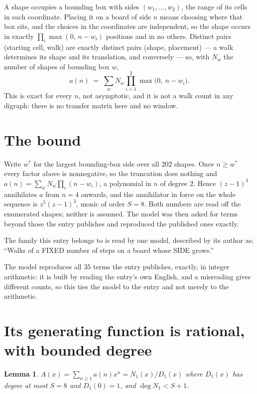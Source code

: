 \documentclass[11pt,a4paper]{article}
\theoremstyle{plain}
\newtheorem{lemma}[theorem]{Lemma}
\theoremstyle{definition}
\begin{document}
A shape occupies a bounding box with sides $(w_1,\dots,w_{2})$, the range of its cells in each
coordinate. Placing it on a board of side $n$ means choosing where that box sits, and the
choices in the coordinates are independent, so the shape occurs in exactly
$\prod_{i}\max(0,\,n-w_i)$ positions and in no others. Distinct pairs (starting cell,
walk) are exactly distinct pairs (shape, placement) --- a walk determines its shape and its
translation, and conversely --- so, with $N_w$ the number of shapes of bounding box $w$,
\[
a(n)\;=\;\sum_{w} N_w \prod_{i=1}^{2}\max\bigl(0,\ n-w_i\bigr).
\]
This is exact for every $n$, not asymptotic, and it is not a walk count in any digraph: there is
no transfer matrix here and no window.

\section{The bound}

Write $w^\ast$ for the largest bounding-box side over all $202$ shapes. Once $n\ge w^\ast$
every factor above is nonnegative, so the truncation does nothing and
$a(n)=\sum_w N_w\prod_i(n-w_i)$, a polynomial in $n$ of degree $2$. Hence $(z-1)^{3}$
annihilates $a$ from $n=4$ onwards, and the annihilator in force on the whole sequence is
$z^{5}(z-1)^{3}$, monic of order $S=8$. Both numbers are read off the enumerated
shapes; neither is assumed. The model was then asked for terms beyond those the entry publishes
and reproduced the published ones exactly.

The family this entry belongs to is read by one model, described by its author as: ``Walks of a FIXED number of steps on a board whose SIDE grows.''


The model reproduces all $35$ terms the entry publishes, exactly, in integer arithmetic:
it is built by reading the entry's own English, and a misreading gives different counts, so
this ties the model to the entry and not merely to the arithmetic.

\section{Its generating function is rational, with bounded degree}

\begin{lemma}\label{lem:rat}
$A(x)=\sum_{n\ge1}a(n)x^n=N_1(x)/D_1(x)$ where $D_1(x)$ has degree at most $S=8$ and
$D_1(0)=1$, and $\deg N_1<S+1$.
\end{lemma}
\end{document}
